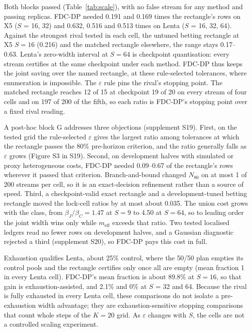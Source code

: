 \documentclass[sigconf,anonymous,review]{acmart}
\newcommand{\eps}{\varepsilon}
\newcommand{\meff}{m_{\text{eff}}}
\begin{document}
Both blocks passed (Table~\ref{tab:scale}), with no false stream for any method and passing replicas. FDC-DP needed 0.191 and 0.169 times the rectangle's rows on X5 ($S$ = 16, 32) and 0.632, 0.516 and 0.513 times on Lenta ($S$ = 16, 32, 64). Against the strongest rival tested in each cell, the untuned betting rectangle at X5 $S = 16$ (0.216) and the matched rectangle elsewhere, the range stays 0.17--0.63. Lenta's zero-width interval at $S = 64$ is checkpoint quantisation: every stream certifies at the same checkpoint under each method. FDC-DP thus keeps the joint saving over the named rectangle, at these rule-selected tolerances, where enumeration is impossible. The $\eps$ rule pins the rival's stopping point. The matched rectangle reaches 12 of 15 at checkpoint 19 of 20 on every stream of four cells and on 197 of 200 of the fifth, so each ratio is FDC-DP's stopping point over a fixed rival reading.

A post-hoc block G addresses three objections (supplement S19). First, on the tested grid the rule-selected $\eps$ gives the largest ratio among tolerances at which the rectangle passes the 80\% pre-horizon criterion, and the ratio generally falls as $\eps$ grows (Figure S3 in S19). Second, on development halves with simulated or proxy heterogeneous costs, FDC-DP needed 0.09--0.67 of the rectangle's rows wherever it passed that criterion. Branch-and-bound changed $N_{80}$ on at most 1 of 200 streams per cell, so it is an exact-decision refinement rather than a source of speed. Third, a checkpoint-valid exact rectangle and a development-tuned betting rectangle moved the lock-cell ratios by at most about 0.035. The union cost grows with the class, from $\beta_J/\beta_C = 1.47$ at $S = 9$ to 4.50 at $S = 64$, so to leading order the joint width wins only while $\meff$ exceeds that ratio. Two tested localised ledgers read no fewer rows on development halves, and a Gaussian diagnostic rejected a third (supplement S20), so FDC-DP pays this cost in full.

Exhaustion qualifies Lenta, about 25\% control, where the 50/50 plan empties its control pools and the rectangle certifies only once all are empty (mean fraction 1 in every Lenta cell). FDC-DP's mean fraction is about 89.8\% at $S = 16$, so that gain is exhaustion-assisted, and 2.1\% and 0\% at $S$ = 32 and 64. Because the rival is fully exhausted in every Lenta cell, these comparisons do not isolate a pre-exhaustion width advantage; they are exhaustion-sensitive stopping comparisons that count whole steps of the $K = 20$ grid. As $\eps$ changes with $S$, the cells are not a controlled scaling experiment.
\end{document}
